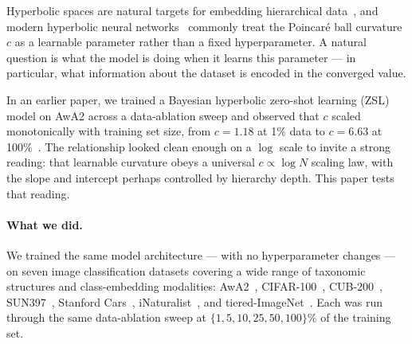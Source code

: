 \documentclass{article}
\begin{document}
Hyperbolic spaces are natural targets for embedding hierarchical data~\cite{nickel2017poincare,nickel2018learning}, and modern hyperbolic neural networks~\cite{ganea2018hyperbolic,becigneul2019riemannian,kochurov2020geoopt} commonly treat the Poincar\'{e} ball curvature $c$ as a learnable parameter rather than a fixed hyperparameter.
A natural question is what the model is doing when it learns this parameter --- in particular, what information about the dataset is encoded in the converged value.

In an earlier paper, we trained a Bayesian hyperbolic zero-shot learning (ZSL) model on AwA2 across a data-ablation sweep and observed that $c$ scaled monotonically with training set size, from $c = 1.18$ at 1\% data to $c = 6.63$ at 100\%~\cite{bejleri2025bayesian}.
The relationship looked clean enough on a $\log$ scale to invite a strong reading: that learnable curvature obeys a universal $c \propto \log N$ scaling law, with the slope and intercept perhaps controlled by hierarchy depth.
This paper tests that reading.

\paragraph{What we did.}
We trained the same model architecture --- with no hyperparameter changes --- on seven image classification datasets covering a wide range of taxonomic structures and class-embedding modalities: AwA2~\cite{xian2018awa2}, CIFAR-100~\cite{krizhevsky2009cifar}, CUB-200~\cite{wah2011cub}, SUN397~\cite{xiao2010sun}, Stanford Cars~\cite{krause2013cars}, iNaturalist~\cite{vanhorn2021inaturalist}, and tiered-ImageNet~\cite{ren2018tiered}.
Each was run through the same data-ablation sweep at $\{1, 5, 10, 25, 50, 100\}\%$ of the training set.
\end{document}
